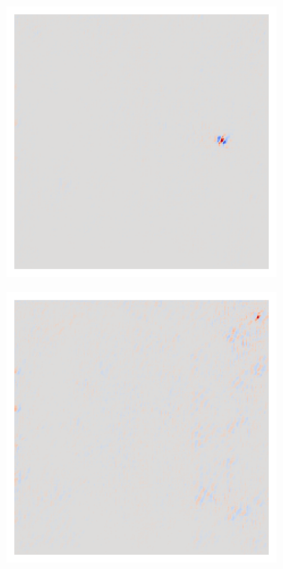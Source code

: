 \begin{figure}[H]
\begin{subfigure}{0.095\linewidth}
    \end{subfigure}\hfill%
    \begin{subfigure}{0.095\linewidth}
        \centering
        \includegraphics[height=1\linewidth]{01-images/05-resultate/uap_resnet18/uap0-resnet18-covidx_data-n200-robustificationslevel2.png}
    \end{subfigure}\hfill%
    \begin{subfigure}{0.095\linewidth}
        \centering
        \includegraphics[height=1\linewidth]{01-images/05-resultate/uap_resnet18/uap0-resnet18-covidx_data-n200-robustificationslevel3.png}

\end{subfigure}
\end{figure}
